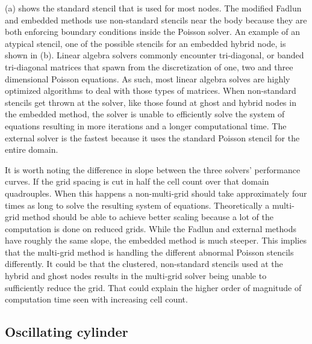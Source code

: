 (a) shows the standard stencil that is used for most nodes. 
The modified Fadlun and embedded methods use non-standard stencils near the body because they are both enforcing boundary conditions inside the Poisson solver. 
An example of an atypical stencil, one of the possible stencils for an embedded hybrid node, is shown in (b). 
Linear algebra solvers commonly encounter tri-diagonal, or banded tri-diagonal
matrices that spawn from the discretization of one, two and three dimensional Poisson equations. 
As such, most linear algebra solves are highly optimized algorithms to deal with those types of matrices. 
When non-standard stencils get thrown at the solver, like those found at ghost and hybrid nodes in the embedded method, the solver is unable to efficiently solve the system of equations resulting in more iterations and a longer computational time. 
The external solver is the fastest because it uses the standard Poisson stencil for the entire domain. 

It is worth noting the difference in slope between the three solvers' performance curves. 
If the grid spacing is cut in half the cell count over that domain quadrouples. 
When this happens a non-multi-grid should take approximately four times as long to solve the resulting system of equations.
Theoretically a multi-grid method should be able to achieve better scaling because a lot of the computation is done on reduced grids. 
While the Fadlun and external methods have roughly the same slope, the embedded method is much steeper. 
This implies that the multi-grid method is handling the different abnormal Poisson stencils differently. 
It could be that the clustered, non-standard stencils used at the hybrid and ghost nodes results in the multi-grid solver being unable to sufficiently reduce the grid. 
That could explain the higher order of magnitude of computation time seen with increasing cell count. 

\subsection{Oscillating cylinder}

